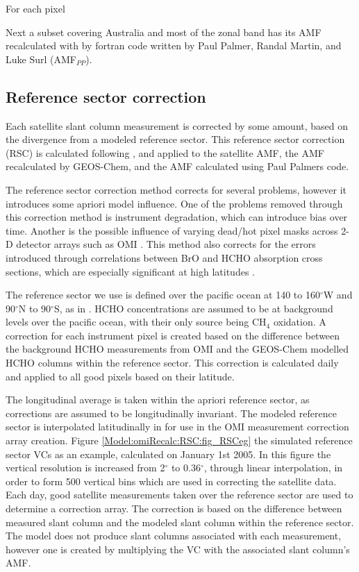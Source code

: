     For each pixel 
    
    Next a subset covering Australia and most of the zonal band has its AMF recalculated with by fortran code written by Paul Palmer, Randal Martin, and Luke Surl (AMF$_{PP}$).
    
  \subsection{Reference sector correction}
    \label{Model:omiRecalc:RSC}
    Each satellite slant column measurement is corrected by some amount, based on the divergence from a modeled reference sector.
    This reference sector correction (RSC) is calculated following \cite{Abad2016}, and applied to the satellite AMF, the AMF recalculated by GEOS-Chem, and the AMF calculated using Paul Palmers code.
    
    The reference sector correction method corrects for several problems, however it introduces some apriori model influence.
    One of the problems removed through this correction method is instrument degradation, which can introduce bias over time.
    Another is the possible influence of varying dead/hot pixel masks across 2-D detector arrays such as OMI \citep{DeSmedt2015}.
    This method also corrects for the errors introduced through correlations between BrO and HCHO absorption cross sections, which are especially significant at high latitudes \citep{Abad2015}.
    
    The reference sector we use is defined over the pacific ocean at 140 to 160$^{\circ}$W and 90$^{\circ}$N to 90$^{\circ}$S, as in \citet{Abad2015}.
    HCHO concentrations are assumed to be at background levels over the pacific ocean, with their only source being CH$_4$ oxidation.
    A correction for each instrument pixel is created based on the difference between the background HCHO measurements from OMI and the GEOS-Chem modelled HCHO columns within the reference sector.
    This correction is calculated daily and applied to all good pixels based on their latitude.
    
    The longitudinal average is taken within the apriori reference sector, as corrections are assumed to be longitudinally invariant.
    The modeled reference sector is interpolated latitudinally in for use in the OMI measurement correction array creation.
    Figure \ref{Model:omiRecalc:RSC:fig_RSCeg} the simulated reference sector VCs as an example, calculated on January 1st 2005.
    In this figure the vertical resolution is increased from 2$^{\circ}$ to 0.36$^{\circ}$, through linear interpolation, in order to form 500 vertical bins which are used in correcting the satellite data.
    Each day, good satellite measurements taken over the reference sector are used to determine a correction array.
    The correction is based on the difference between measured slant column and the modeled slant column within the reference sector.
    The model does not produce slant columns associated with each measurement, however one is created by multiplying the VC with the associated slant column's AMF.
    
